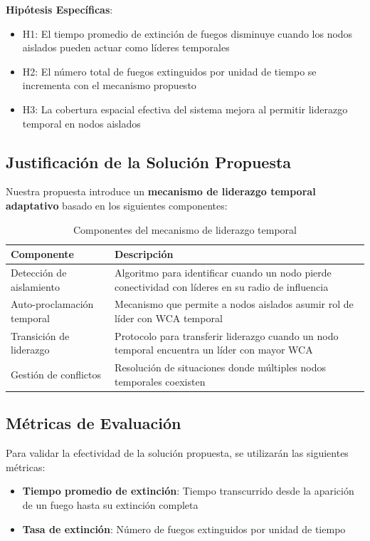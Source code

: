 \documentclass{article}
\begin{document}
\textbf{Hipótesis Específicas}:
\begin{itemize}
    \item H1: El tiempo promedio de extinción de fuegos disminuye cuando los nodos aislados pueden actuar como líderes temporales
    \item H2: El número total de fuegos extinguidos por unidad de tiempo se incrementa con el mecanismo propuesto
    \item H3: La cobertura espacial efectiva del sistema mejora al permitir liderazgo temporal en nodos aislados
\end{itemize}

\subsection{Justificación de la Solución Propuesta}
Nuestra propuesta introduce un \textbf{mecanismo de liderazgo temporal adaptativo} basado en los siguientes componentes:

\begin{table}[h!]
\centering
\caption{Componentes del mecanismo de liderazgo temporal}
\label{tab:componentes_liderazgo}
\begin{tabular}{p{4cm} p{8cm}}
\toprule
\textbf{Componente} & \textbf{Descripción} \\
\midrule
Detección de aislamiento & Algoritmo para identificar cuando un nodo pierde conectividad con líderes en su radio de influencia \\
Auto-proclamación temporal & Mecanismo que permite a nodos aislados asumir rol de líder con WCA temporal \\
Transición de liderazgo & Protocolo para transferir liderazgo cuando un nodo temporal encuentra un líder con mayor WCA \\
Gestión de conflictos & Resolución de situaciones donde múltiples nodos temporales coexisten \\
\bottomrule
\end{tabular}
\end{table}

\subsection{Métricas de Evaluación}
Para validar la efectividad de la solución propuesta, se utilizarán las siguientes métricas:

\begin{itemize}
    \item \textbf{Tiempo promedio de extinción}: Tiempo transcurrido desde la aparición de un fuego hasta su extinción completa
    \item \textbf{Tasa de extinción}: Número de fuegos extinguidos por unidad de tiempo
\end{itemize}
\end{document}
